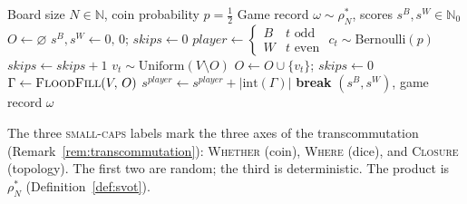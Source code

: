 \documentclass[11pt,a4paper]{article}
\begin{document}
\begin{algorithm}[ht]
\caption{Drunk Walk
  \textup{[Self-Variational Optimal Transport Sampling]}}\label{alg:drunk-walk}
\begin{algorithmic}[1]
\Require Board size $N \in \mathbb{N}$,
  coin probability $p = \tfrac{1}{2}$
\Ensure Game record $\omega \sim \rho^*_N$,
  scores $s^B, s^W \in \mathbb{N}_0$
\State $O \gets \varnothing$
\State $s^B, s^W \gets 0,\, 0$;\;
  $\textit{skips} \gets 0$
  \State $\textit{player} \gets
    \begin{cases} B & t \text{ odd} \\ W & t \text{ even}
    \end{cases}$
  \State $c_t \sim \mathrm{Bernoulli}(p)$
    \State $\textit{skips} \gets \textit{skips} + 1$
  \Else
    \State $v_t \sim \mathrm{Uniform}(V \setminus O)$
    \State $O \gets O \cup \{v_t\}$;\;
      $\textit{skips} \gets 0$
    \State $\Gamma \gets
      \textsc{FloodFill}(V,\, O)$
    \If{$\Gamma \neq \varnothing$}
      \State $s^{\textit{player}} \gets
        s^{\textit{player}} + |\mathrm{int}(\Gamma)|$
    \EndIf
  \EndIf
    \State \textbf{break}
  \EndIf
\EndFor
\State \Return $(s^B, s^W)$, game record $\omega$
\end{algorithmic}
\end{algorithm}

\noindent
The three \textsc{small-caps} labels mark the three
axes of the transcommutation
(Remark~\ref{rem:transcommutation}):
\textsc{Whether} (coin), \textsc{Where} (dice),
and \textsc{Closure} (topology).
The first two are random; the third is deterministic.
The product is $\rho^*_N$
(Definition~\ref{def:svot}).
\end{document}

